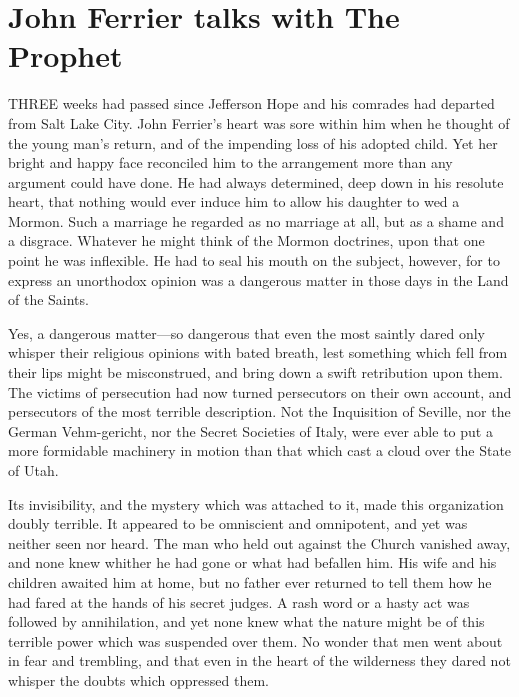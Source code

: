 \documentclass[12pt]{book}
\begin{document}
\chapter{John Ferrier talks with The Prophet} 

THREE weeks had passed since Jefferson Hope and his comrades had departed from Salt Lake City. John Ferrier’s heart was sore within him when he thought of the young man’s return, and of the impending loss of his adopted child. Yet her bright and happy face reconciled him to the arrangement more than any argument could have done. He had always determined, deep down in his resolute heart, that nothing would ever induce him to allow his daughter to wed a Mormon. Such a marriage he regarded as no marriage at all, but as a shame and a disgrace. Whatever he might think of the Mormon doctrines, upon that one point he was inflexible. He had to seal his mouth on the subject, however, for to express an unorthodox opinion was a dangerous matter in those days in the Land of the Saints. 

Yes, a dangerous matter—so dangerous that even the most saintly dared only whisper their religious opinions with bated breath, lest something which fell from their lips might be misconstrued, and bring down a swift retribution upon them. The victims of persecution had now turned persecutors on their own account, and persecutors of the most terrible description. Not the Inquisition of Seville, nor the German Vehm-gericht, nor the Secret Societies of Italy, were ever able to put a more formidable machinery in motion than that which cast a cloud over the State of Utah. 

Its invisibility, and the mystery which was attached to it, made this organization doubly terrible. It appeared to be omniscient and omnipotent, and yet was neither seen nor heard. The man who held out against the Church vanished away, and none knew whither he had gone or what had befallen him. His wife and his children awaited him at home, but no father ever returned to tell them how he had fared at the hands of his secret judges. A rash word or a hasty act was followed by annihilation, and yet none knew what the nature might be of this terrible power which was suspended over them. No wonder that men went about in fear and trembling, and that even in the heart of the wilderness they dared not whisper the doubts which oppressed them. 
\end{document}
